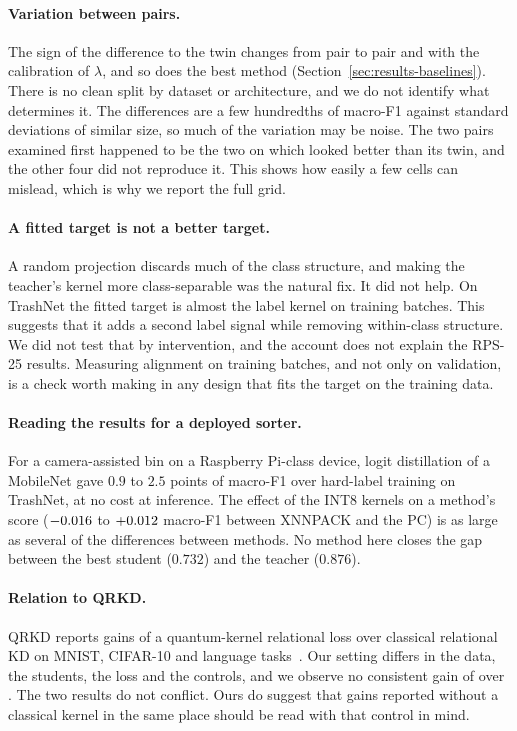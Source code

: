 \paragraph{Variation between pairs.}
The sign of the difference to the twin changes from pair to pair and with the calibration of $\lambda$, and so does the best method (Section~\ref{sec:results-baselines}).
There is no clean split by dataset or architecture, and we do not identify what determines it. The differences are a few hundredths of macro-F1 against standard deviations of similar size, so much of the variation may be noise.
The two pairs examined first happened to be the two on which \Pqk looked better than its twin, and the other four did not reproduce it.
This shows how easily a few cells can mislead, which is why we report the full grid.

\paragraph{A fitted target is not a better target.}
A random projection discards much of the class structure, and making the teacher's kernel more class-separable was the natural fix. It did not help.
On TrashNet the fitted target is almost the label kernel on training batches. This suggests that it adds a second label signal while removing within-class structure. We did not test that by intervention, and the account does not explain the RPS-25 results.
Measuring alignment on training batches, and not only on validation, is a check worth making in any design that fits the target on the training data.

\paragraph{Reading the results for a deployed sorter.}
For a camera-assisted bin on a Raspberry Pi-class device, logit distillation of a MobileNet gave $0.9$ to $2.5$ points of macro-F1 over hard-label training on TrashNet, at no cost at inference. The effect of the INT8 kernels on a method's score ($-0.016{}$ to $+0.012{}$ macro-F1 between XNNPACK and the PC) is as large as several of the differences between methods.
No method here closes the gap between the best student ($0.732$) and the teacher ($0.876$).

\paragraph{Relation to QRKD.}
QRKD reports gains of a quantum-kernel relational loss over classical relational KD on MNIST, CIFAR-10 and language tasks~\citep{liu2025qrkd}.
Our setting differs in the data, the students, the loss and the controls, and we observe no consistent gain of \Pqk over \Rkd.
The two results do not conflict. Ours do suggest that gains reported without a classical kernel in the same place should be read with that control in mind.
